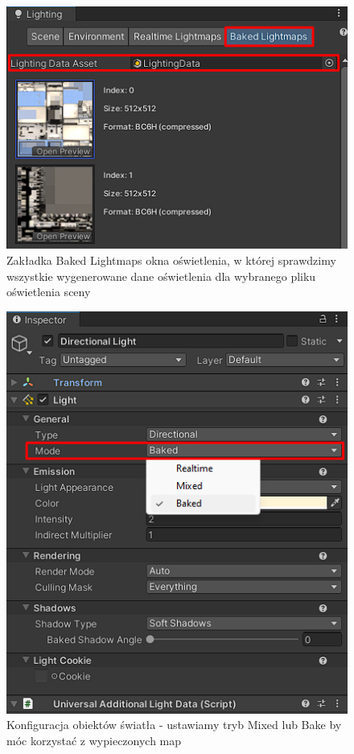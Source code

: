 \begin{figure}[h]
    \centering
    \includegraphics[width=0.5\linewidth]{Images/bakedLightmaps.png}
    \caption{Zakładka Baked Lightmaps okna oświetlenia, w której sprawdzimy wszystkie wygenerowane dane oświetlenia dla wybranego pliku oświetlenia sceny}
\end{figure}
\FloatBarrier
\begin{figure}[h]
    \centering
    \includegraphics[scale=0.4]{Images/lightSettingsInspector.png}
    \caption{Konfiguracja obiektów światła - ustawiamy tryb Mixed lub Bake by móc korzystać z wypieczonych map}
\end{figure}
